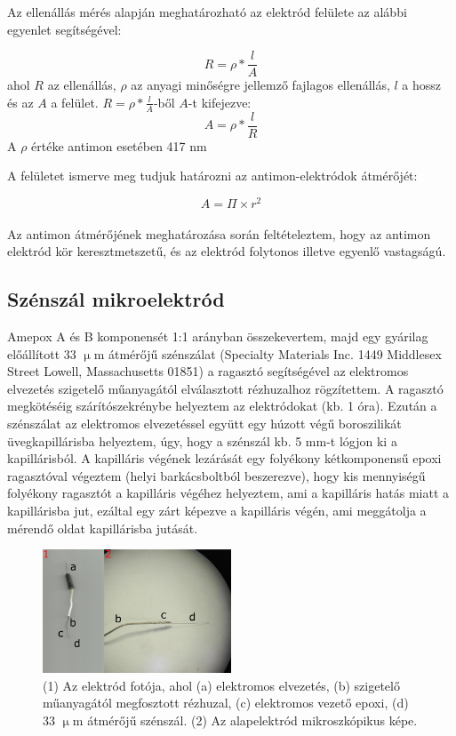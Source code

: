 Az ellenállás mérés alapján meghatározható az elektród felülete az alábbi egyenlet segítségével:

\begin{equation}
R = \rho * \frac{l}{A}
\end{equation}
ahol $R$ az ellenállás, $\rho$ az anyagi minőségre jellemző fajlagos ellenállás, $l$ a hossz és az $A$ a felület. $R = \rho * \frac{l}{A}$-ből $A$-t kifejezve:
\begin{equation} 
\label{eq:A1}
A = \rho * \frac{l}{R}
\end{equation}
A $\rho$ értéke antimon esetében 417 n\Omega m

A felületet ismerve meg tudjuk határozni az antimon-elektródok átmérőjét:

\begin{equation} 
\label{eq:A2}
A = \Pi \times r^2
\end{equation}\\
Az antimon átmérőjének meghatározása során feltételeztem, hogy az antimon elektród kör keresztmetszetű, és az elektród folytonos illetve egyenlő vastagságú.

\subsection{Szénszál mikroelektród}
Amepox A és B komponensét 1:1 arányban összekevertem, majd egy gyárilag előállított 33 $\upmu$m átmérőjű szénszálat (Specialty Materials Inc. 1449 Middlesex Street Lowell, Massachusetts 01851) a ragasztó segítségével az elektromos elvezetés szigetelő műanyagától elválasztott rézhuzalhoz rögzítettem. A ragasztó megkötéséig szárítószekrénybe helyeztem az elektródokat (kb. 1 óra). Ezután a szénszálat az elektromos elvezetéssel együtt egy húzott végű boroszilikát üvegkapillárisba helyeztem, úgy, hogy a szénszál kb. 5 mm-t lógjon ki a kapillárisból. A kapilláris végének lezárását egy folyékony kétkomponensű epoxi ragasztóval végeztem (helyi barkácsboltból beszerezve), hogy kis mennyiségű folyékony ragasztót a kapilláris végéhez helyeztem, ami a kapilláris hatás miatt a kapillárisba jut, ezáltal egy zárt képezve a kapilláris végén, ami meggátolja a mérendő oldat kapillárisba jutását.
\begin{figure}[h]
\centering
\includegraphics[width=0.5\textwidth]{img/szen33.png}
\caption{(1) Az elektród fotója, ahol (a) elektromos elvezetés, (b) szigetelő műanyagától megfosztott rézhuzal, (c) elektromos vezető epoxi, (d) 33 $\upmu$m átmérőjű szénszál. (2) Az alapelektród mikroszkópikus képe.}
\label{fig:ionophores}
\end{figure}

